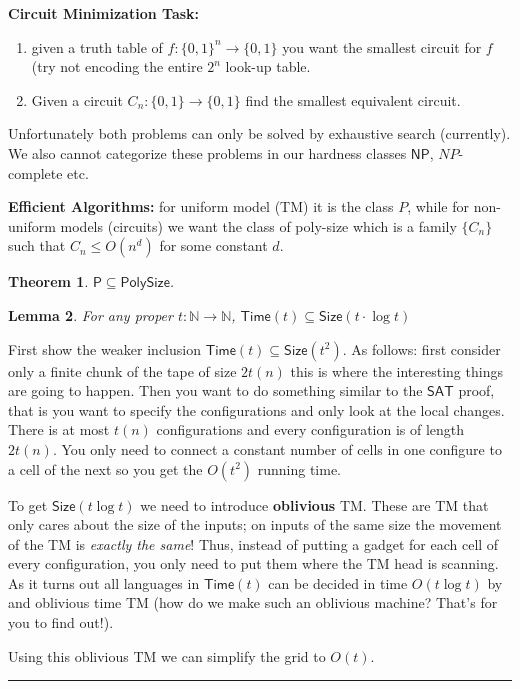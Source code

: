 \documentclass[twoside]{article}
\newcounter{lecnum}
\newtheorem{theorem}{Theorem}[lecnum]
\newtheorem{lemma}[theorem]{Lemma}
\newenvironment{proof}{{\bf Proof:}}{\hfill\rule{2mm}{2mm}}
\def\N{\mathbb{N}}
\def\P{\mathsf{P}}
\def\NP{\mathsf{NP}}
\begin{document}
\textbf{Circuit Minimization Task:} 

\begin{enumerate}
\item given a truth table of $f: \{0,1\}^n \rightarrow \{0,1\}$ you want the smallest circuit for $f$ (try not encoding the entire $2^n$ look-up table.
\item Given a circuit $C_n: \{0,1\} \rightarrow \{0,1\}$ find the smallest equivalent circuit.
\end{enumerate}
Unfortunately both problems can only be solved by exhaustive search (currently). We also cannot categorize these problems in our hardness classes $\NP$, $NP$-complete etc.

\textbf{Efficient Algorithms:} for uniform model (TM) it is the class $P$, while for non-uniform models (circuits) we want the class of poly-size which is a family $\{C_n\}$ such that $C_n \leq O(n^d)$ for some constant $d$. 

\begin{theorem}
$\P \subseteq \mathsf{PolySize}$.
\end{theorem}
\begin{lemma}
For any proper $t: \N \rightarrow \N$, $\mathsf{Time}(t) \subseteq \mathsf{Size}(t\cdot \log t)$
\end{lemma}
\begin{proof}
First show the weaker inclusion $\mathsf{Time}(t) \subseteq \mathsf{Size}(t^2)$. As follows: first consider only a finite chunk of the tape of size $2t(n)$ this is where the interesting things are going to happen. Then you want to do something similar to the $\mathsf{SAT}$ proof, that is you want to specify the configurations and only look at the local changes. There is at most $t(n)$ configurations and every configuration is of length $2t(n)$. You only need to connect a constant number of cells in one configure to a cell of the next so you get the $O(t^2)$ running time. 

To get $\mathsf{Size}(t\log t)$ we need to introduce \textbf{oblivious} TM. These are TM that only cares about the size of the inputs; on inputs of the same size the movement of the TM is \emph{exactly the same}! Thus, instead of putting a gadget for each cell of every configuration, you only need to put them where the TM head is scanning. As it turns out all languages in $\mathsf{Time}(t)$ can be decided in time $O(t \log t)$ by and oblivious time TM (how do we make such an oblivious machine? That's for you to find out!).

Using this oblivious TM we can simplify the grid to $O(t)$. 
\end{proof}
\end{document}

